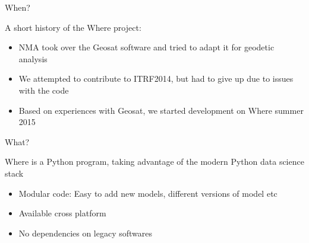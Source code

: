 \documentclass[ignorenonframetext,12pt,t]{beamer}
\begin{document}
\begin{frame}{When?}
  \begin{centering}
    A short history of the Where project:
  \end{centering}
  \pause

  \begin{itemize}
  \item<2-> NMA took over the Geosat software and tried to adapt it for geodetic analysis
  \item<3-> We attempted to contribute to ITRF2014, but had to give up due to issues with the code
  \item<4-> Based on experiences with Geosat, we started development on Where summer 2015
  \end{itemize}

\end{frame}

\begin{frame}{What?}
  \begin{centering}
    Where is a Python program, taking advantage of the modern Python data science stack
  \end{centering}
  \pause

  \begin{itemize}
   \item Modular code: Easy to add new models, different versions of model etc
   \item Available cross platform
   \item No dependencies on legacy softwares
  \end{itemize}
\end{frame}
\end{document}
